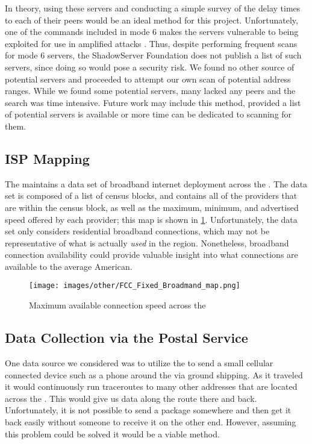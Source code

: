 In theory, using these servers and conducting a simple survey of the delay times to each of their peers would be an ideal method for this project. Unfortunately, one of the commands included in mode 6 makes the servers vulnerable to being exploited for use in amplified \ddos attacks \cite{USDepartmentofHomelandSecurity2014NTPCVE-2013-5211}. Thus, despite performing frequent scans for mode 6 servers, the ShadowServer Foundation does not publish a list of such servers, since doing so would pose a security risk. We found no other source of potential servers and proceeded to attempt our own scan of potential \ip address ranges. While we found some potential servers, many lacked any peers and the search was time intensive. Future work may include this method, provided a list of potential servers is available or more time can be dedicated to scanning for them.

\subsection{ISP Mapping}
The \FCC maintains a data set of broadband internet deployment across the \us \cite{FederalCommunicationsCommission}. The data set is composed of a list of census blocks, and contains all of the providers that are within the census block, as well as the maximum, minimum, and advertised speed offered by each provider; this map is shown in \cref{fig:broadband_map}. Unfortunately, the data set only considers residential broadband connections, which may not be representative of what is actually \textit{used} in the region. Nonetheless, broadband connection availability could provide valuable insight into what connections are available to the average American.

\begin{figure}
    \centering
    \texttt{[image: images/other/FCC\_Fixed\_Broadmand\_map.png]}
    \caption{Maximum available connection speed across the \us}
    \label{fig:broadband_map}
\end{figure}

\subsection{Data Collection via the Postal Service}
One data source we considered was to utilize the \usps to send a small cellular connected device such as a phone around the \us via ground shipping. As it traveled it would continuously run traceroutes to many other \ip addresses that are located across the \us. This would give us data along the route there and back. Unfortunately, it is not possible to send a package somewhere and then get it back easily without someone to receive it on the other end. However, assuming this problem could be solved it would be a viable method.

